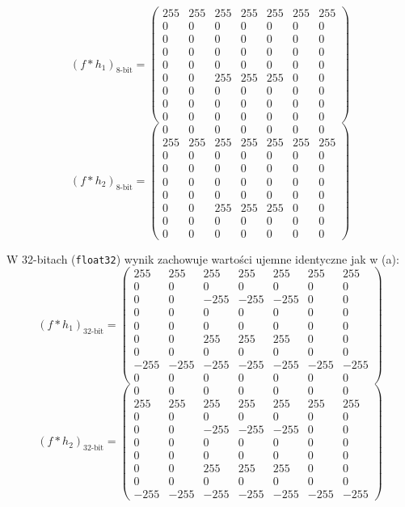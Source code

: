 \documentclass[12pt,a4paper,oneside,openany,oneauthor,masterthesis,deansoffice]{mfipl}
\begin{document}
\[
(f * h_1)_{8\text{-bit}} = \begin{pmatrix}
255 & 255 & 255 & 255 & 255 & 255 & 255 \\
0 & 0 & 0 & 0 & 0 & 0 & 0 \\
0 & 0 & 0 & 0 & 0 & 0 & 0 \\
0 & 0 & 0 & 0 & 0 & 0 & 0 \\
0 & 0 & 0 & 0 & 0 & 0 & 0 \\
0 & 0 & 255 & 255 & 255 & 0 & 0 \\
0 & 0 & 0 & 0 & 0 & 0 & 0 \\
0 & 0 & 0 & 0 & 0 & 0 & 0 \\
0 & 0 & 0 & 0 & 0 & 0 & 0
\end{pmatrix}
\]
\[
(f * h_2)_{8\text{-bit}} = \begin{pmatrix}
0 & 0 & 0 & 0 & 0 & 0 & 0 \\
255 & 255 & 255 & 255 & 255 & 255 & 255 \\
0 & 0 & 0 & 0 & 0 & 0 & 0 \\
0 & 0 & 0 & 0 & 0 & 0 & 0 \\
0 & 0 & 0 & 0 & 0 & 0 & 0 \\
0 & 0 & 0 & 0 & 0 & 0 & 0 \\
0 & 0 & 255 & 255 & 255 & 0 & 0 \\
0 & 0 & 0 & 0 & 0 & 0 & 0 \\
0 & 0 & 0 & 0 & 0 & 0 & 0
\end{pmatrix}
\]

W 32-bitach (\texttt{float32}) wynik zachowuje wartości ujemne identyczne jak w (a):
\[
(f * h_1)_{32\text{-bit}} = \begin{pmatrix}
255 & 255 & 255 & 255 & 255 & 255 & 255 \\
0 & 0 & 0 & 0 & 0 & 0 & 0 \\
0 & 0 & -255 & -255 & -255 & 0 & 0 \\
0 & 0 & 0 & 0 & 0 & 0 & 0 \\
0 & 0 & 0 & 0 & 0 & 0 & 0 \\
0 & 0 & 255 & 255 & 255 & 0 & 0 \\
0 & 0 & 0 & 0 & 0 & 0 & 0 \\
-255 & -255 & -255 & -255 & -255 & -255 & -255 \\
0 & 0 & 0 & 0 & 0 & 0 & 0
\end{pmatrix}
\]
\[
(f * h_2)_{32\text{-bit}} = \begin{pmatrix}
0 & 0 & 0 & 0 & 0 & 0 & 0 \\
255 & 255 & 255 & 255 & 255 & 255 & 255 \\
0 & 0 & 0 & 0 & 0 & 0 & 0 \\
0 & 0 & -255 & -255 & -255 & 0 & 0 \\
0 & 0 & 0 & 0 & 0 & 0 & 0 \\
0 & 0 & 0 & 0 & 0 & 0 & 0 \\
0 & 0 & 255 & 255 & 255 & 0 & 0 \\
0 & 0 & 0 & 0 & 0 & 0 & 0 \\
-255 & -255 & -255 & -255 & -255 & -255 & -255
\end{pmatrix}
\]
\end{document}
